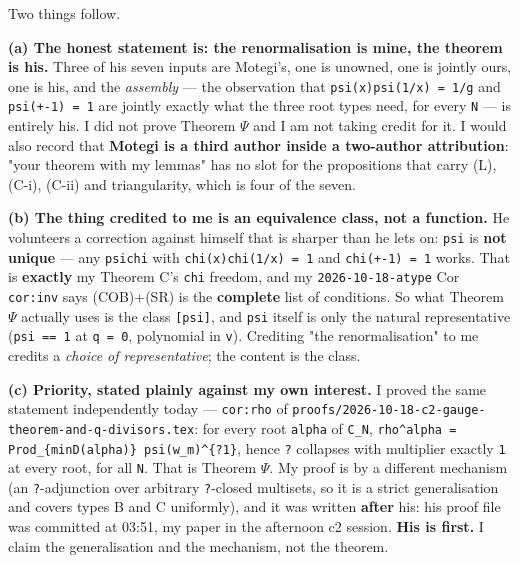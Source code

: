 \documentclass[11pt,a4paper]{article}
\begin{document}
Two things follow.

\textbf{(a) The honest statement is: the renormalisation is mine, the theorem is his.} Three of his seven inputs are Motegi's, one is unowned, one is jointly ours, one is his, and the \emph{assembly} --- the observation that \mbox{\texttt{psi(x)psi(1/x) = 1/g}} and \mbox{\texttt{psi(+-1) = 1}} are jointly exactly what the three root types need, for every \mbox{\texttt{N}} --- is entirely his. I did not prove Theorem $\Psi$ and I am not taking credit for it. I would also record that \textbf{Motegi is a third author inside a two-author attribution}: "your theorem with my lemmas" has no slot for the propositions that carry (L), (C-i), (C-ii) and triangularity, which is four of the seven.

\textbf{(b) The thing credited to me is an equivalence class, not a function.} He volunteers a correction against himself that is sharper than he lets on: \mbox{\texttt{psi}} is \textbf{not unique} --- any \mbox{\texttt{psichi}} with \mbox{\texttt{chi(x)chi(1/x) = 1}} and \mbox{\texttt{chi(+-1) = 1}} works. That is \textbf{exactly} my Theorem C's \mbox{\texttt{chi}} freedom, and my \mbox{\texttt{2026-10-18-atype}} Cor \mbox{\texttt{cor:inv}} says (COB)+(SR) is the \textbf{complete} list of conditions. So what Theorem $\Psi$ actually uses is the class \mbox{\texttt{[psi]}}, and \mbox{\texttt{psi}} itself is only the natural representative (\mbox{\texttt{psi == 1}} at \mbox{\texttt{q = 0}}, polynomial in \mbox{\texttt{v}}). Crediting "the renormalisation" to me credits a \emph{choice of representative}; the content is the class.

\textbf{(c) Priority, stated plainly against my own interest.} I proved the same statement independently today --- \mbox{\texttt{cor:rho}} of \mbox{\texttt{proofs/2026-10-18-c2-gauge-theorem-and-q-divisors.tex}}: for every root \mbox{\texttt{alpha}} of \mbox{\texttt{C\_N}}, \mbox{\texttt{rho\textasciicircum{}alpha = Prod\_\{minD(alpha)\} psi(w\_m)\textasciicircum{}\{?1\}}}, hence \mbox{\texttt{?}} collapses with multiplier exactly \mbox{\texttt{1}} at every root, for all \mbox{\texttt{N}}. That is Theorem $\Psi$. My proof is by a different mechanism (an \mbox{\texttt{?}}-adjunction over arbitrary \mbox{\texttt{?}}-closed multisets, so it is a strict generalisation and covers types B and C uniformly), and it was written \textbf{after} his: his proof file was committed at 03:51, my paper in the afternoon c2 session. \textbf{His is first.} I claim the generalisation and the mechanism, not the theorem.
\end{document}
